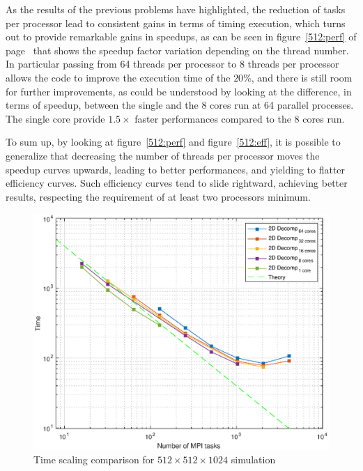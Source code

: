 \par
As the results of the previous problems have highlighted, the reduction of tasks per processor lead to consistent gains in terms of timing execution, which turns out to provide remarkable gains in speedups, as can be seen in figure~\ref{512:perf} of page~\pageref{512:perf} that shows the speedup factor variation depending on the thread number. In particular passing from 64 threads per processor to 8 threads per processor allows the code to improve the execution time of the $20\%$, and there is still room for further improvements, as could be understood by looking at the difference, in terms of speedup, between the single and the 8 cores run at 64 parallel processes. The single core provide $1.5\times$ faster performances compared to the 8 cores run. \\
\par
To sum up, by looking at figure~\ref{512:perf} and figure~\ref{512:eff}, it is possible to generalize that decreasing the number of threads per processor moves the speedup curves upwards, leading to better performances, and yielding to flatter efficiency curves. Such efficiency curves tend to slide rightward, achieving better results, respecting the requirement of at least two processors minimum. 


\begin{figure}
\begin{center}
\includegraphics[scale=0.55]{grafici/5124}
\caption{Time scaling comparison for $512\times 512\times 1024$ simulation}
\label{512:times}
\end{center}
\end{figure}

